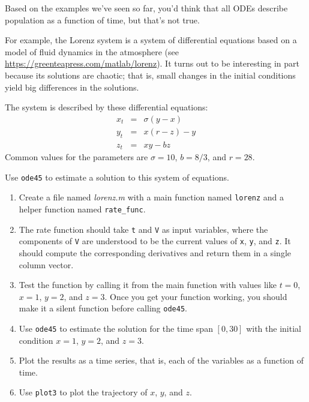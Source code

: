\documentclass[../../book.tex]{subfiles}
\begin{document}
\begin{ex}


Based on the examples we've seen so far, you'd think that all ODEs describe population as
a function of time, but that's not true.

For example, the Lorenz system is a system of differential equations based on a model of fluid dynamics in the atmosphere
(see \url{https://greenteapress.com/matlab/lorenz}).
It turns out to be interesting in part because its solutions are chaotic; that is, small changes in the initial conditions yield big differences in the solutions.

The system is described by these differential equations:
%
\begin{eqnarray*}
x_t &=& \sigma (y - x)  \\
y_t &=& x (r - z) - y   \\
z_t &=& xy - b z
\end{eqnarray*}
%
Common values for the parameters are $\sigma = 10$, $b = 8/3$, and $r=28$.

Use \lstinline{ode45} to estimate a solution to this system of equations.

\begin{enumerate}

\item Create a file named \emph{lorenz.m} with a main function named \lstinline{lorenz} and a helper function named \lstinline{rate_func}.

\item  The rate function should
take \lstinline{t} and \lstinline{V} as input variables, where the components
of \lstinline{V} are understood to be the current values of \lstinline{x},
\lstinline{y}, and \lstinline{z}.  It should compute the corresponding derivatives
and return them in a single column vector.

\item Test the function by calling it from the main function with values like $t=0$, $x=1$, $y=2$, and $z=3$.
Once you get your function working, you should make it a silent function before calling \lstinline{ode45}.

\item Use \lstinline{ode45} to estimate the solution for the time span $[0, 30]$
with the initial condition $x=1$, $y=2$, and $z=3$.

\item Plot the results as a time series, that is, each of the variables as a function of time.

\item Use \lstinline{plot3} to plot the trajectory of $x$, $y$, and $z$.

\end{enumerate}


\end{ex}
\end{document}
